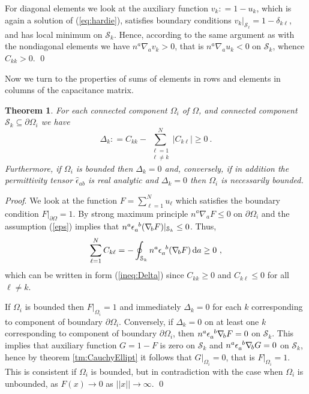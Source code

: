 \documentclass[12pt]{iopart}
\newcommand{\defeq}{\mathrel{\mathop:}=}
\newcommand{\dd}{\partial}
\newcommand{\nab}[1]{\nabla_{\! #1}}
\newcommand{\df}{\mathrm{d}}
\newcommand{\be}{\begin{equation}}
\newcommand{\ee}{\end{equation}}
\newcommand{\0}{\vct{0}}
\theoremstyle{plain} \newtheorem{tm}{Theorem}[section]
\theoremstyle{plain} \newtheorem{lm}[tm]{Lemma}
\theoremstyle{definition} \newtheorem{defn}[tm]{Definition}
\newcommand{\btm}{\begin{tm}}
\newcommand{\etm}{\end{tm}}
\begin{document}
For diagonal elements we look at the auxiliary function $v_k \defeq 1 - u_k$, which is again a solution of (\ref{eq:hardie}), satisfies boundary conditions $v_k|_{\mathcal{S}_\ell} = 1 - \delta_{k\ell}$, and has local minimum on $\mathcal{S}_k$. Hence, according to the same argument as with the nondiagonal elements we have $n^a \nab{a} v_k > 0$, that is $n^a \nab{a} u_k < 0$ on $\mathcal{S}_k$, whence $C_{kk} > 0$. \qed

\medskip

Now we turn to the properties of sums of elements in rows and elements in columns of the capacitance matrix.

\medskip



\btm
For each connected component $\Omega_i$ of $\Omega$, and connected component $\mathcal{S}_k \subseteq \dd\Omega_i$ we have
\be\label{ineq:Delta}
\Delta_k \defeq C_{kk} - \sum_{\substack{\ell=1 \\ \ell\neq k}}^N |C_{k\ell}| \ge 0 \ .
\ee
Furthermore, if $\Omega_i$ is bounded then $\Delta_k = 0$ and, conversely, if in addition the permittivity tensor $\hat{\epsilon}_{ab}$ is real analytic and $\Delta_k = 0$ then $\Omega_i$ is necessarily bounded.
\etm 

\emph{Proof}. We look at the function $F = \sum_{\ell=1}^N u_\ell$ which satisfies the boundary condition $F|_{\dd\Omega} = 1$. By strong maximum principle $n^a \nab{a} F \le 0$ on $\dd\Omega_i$ and the assumption (\ref{eps}) implies that $n^a \tensor{\epsilon}{_a^b} (\nab{b} F) |_{\mathcal{S}_k} \le 0$. Thus,
\begin{equation*}
\sum_{\ell=1}^N C_{k\ell} = - \oint_{\mathcal{S}_k} n^a \tensor{\epsilon}{_a^b} (\nab{b} F) \, \df a \ge 0 \ ,
\end{equation*}
which can be written in form (\ref{ineq:Delta}) since $C_{kk} \ge 0$ and $C_{k\ell} \le 0$ for all $\ell \ne k$.

If $\Omega_i$ is bounded then $F|_{\Omega_i} = 1$ and immediately $\Delta_k = 0$ for each $k$ corresponding to component of boundary $\dd\Omega_i$. Conversely, if $\Delta_k = 0$ on at least one $k$ corresponding to component of boundary $\dd\Omega_i$, then $n^a \tensor{\epsilon}{_a^b} \nab{b} F = 0$ on $\mathcal{S}_k$. This implies that auxiliary function $G = 1 - F$ is zero on $\mathcal{S}_k$ and $n^a \tensor{\epsilon}{_a^b} \nab{b} G = 0$ on $\mathcal{S}_k$, hence by theorem \ref{tm:CauchyEllipt} it follows that $G|_{\Omega_i} = 0$, that is $F|_{\Omega_i} = 1$. This is consistent if $\Omega_i$ is bounded, but in contradiction with the case when $\Omega_i$ is unbounded, as $F(x) \to 0$ as $||x|| \to \infty$. \qed
\end{document}
